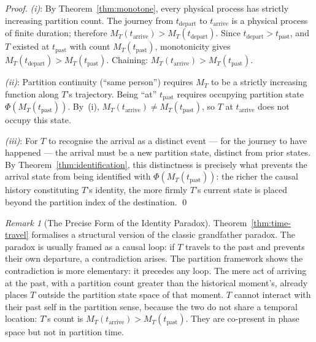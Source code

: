 \documentclass[twocolumn,10pt,a4paper]{article}
\theoremstyle{thmstyle}
\theoremstyle{definition}
\theoremstyle{remark}
\newtheorem{remark}[theorem]{Remark}
\newcommand{\PhiMap}{\varPhi}
\begin{document}
\begin{proof}
\textit{(i)}: By Theorem~\ref{thm:monotone}, every physical process has strictly increasing partition count. The journey from $t_{\mathrm{depart}}$ to $t_{\mathrm{arrive}}$ is a physical process of finite duration; therefore $M_T(t_{\mathrm{arrive}}) > M_T(t_{\mathrm{depart}})$. Since $t_{\mathrm{depart}} > t_{\mathrm{past}}$, and $T$ existed at $t_{\mathrm{past}}$ with count $M_T(t_{\mathrm{past}})$, monotonicity gives $M_T(t_{\mathrm{depart}}) > M_T(t_{\mathrm{past}})$. Chaining: $M_T(t_{\mathrm{arrive}}) > M_T(t_{\mathrm{past}})$.

\textit{(ii)}: Partition continuity (``same person'') requires $M_T$ to be a strictly increasing function along $T$'s trajectory. Being ``at'' $t_{\mathrm{past}}$ requires occupying partition state $\PhiMap(M_T(t_{\mathrm{past}}))$. By~(i), $M_T(t_{\mathrm{arrive}}) \neq M_T(t_{\mathrm{past}})$, so $T$ at $t_{\mathrm{arrive}}$ does not occupy this state.

\textit{(iii)}: For $T$ to recognise the arrival as a distinct event --- for the journey to have happened --- the arrival must be a new partition state, distinct from prior states. By Theorem~\ref{thm:identification}, this distinctness is precisely what prevents the arrival state from being identified with $\PhiMap(M_T(t_{\mathrm{past}}))$: the richer the causal history constituting $T$'s identity, the more firmly $T$'s current state is placed beyond the partition index of the destination. \qed
\end{proof}

\begin{remark}[The Precise Form of the Identity Paradox]
\label{rem:identity-paradox}
Theorem~\ref{thm:time-travel} formalises a structural version of the classic grandfather paradox. The paradox is usually framed as a causal loop: if $T$ travels to the past and prevents their own departure, a contradiction arises. The partition framework shows the contradiction is more elementary: it precedes any loop. The mere act of arriving at the past, with a partition count greater than the historical moment's, already places $T$ outside the partition state space of that moment. $T$ cannot interact with their past self in the partition sense, because the two do not share a temporal location: $T$'s count is $M_T(t_{\mathrm{arrive}}) > M_T(t_{\mathrm{past}})$. They are co-present in phase space but not in partition time.
\end{remark}
\end{document}
